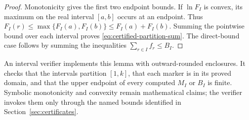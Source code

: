 \begin{proof}
Monotonicity gives the first two endpoint bounds.  If $\ln F_I$ is convex,
its maximum on the real interval $[a,b]$ occurs at an endpoint.  Thus
$F_I(r)\leq\max\{F_I(a),F_I(b)\}\leq F_I(a)+F_I(b)$.
Summing the pointwise bound over each interval proves
\eqref{eq:certified-partition-sum}.  The direct-bound case follows by
summing the inequalities $\sum_{r\in I}f_r\leq B_I$.
\end{proof}

An interval verifier implements this lemma with outward-rounded enclosures.
It checks that the intervals partition $[1,k]$, that each marker is in its
proved domain, and that the upper endpoint of every computed $M_I$ or $B_I$
is finite.  Symbolic monotonicity and convexity remain mathematical claims;
the verifier invokes them only through the named bounds identified in
Section~\ref{sec:certificates}.
